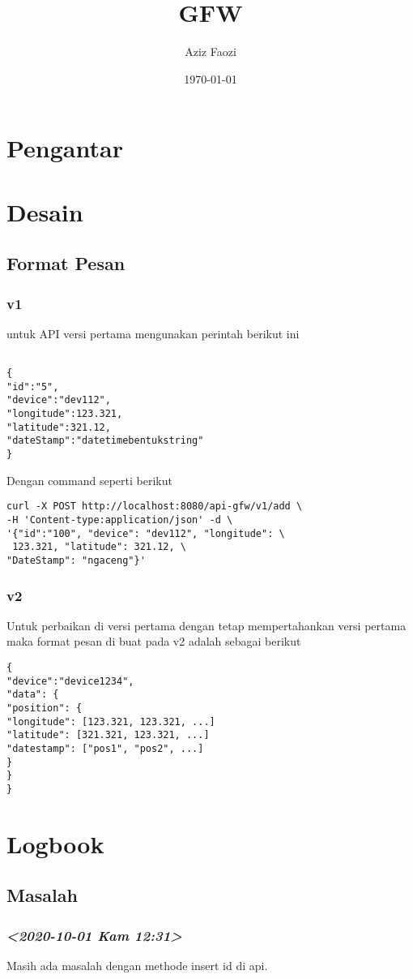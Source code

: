 \documentclass[11pt]{article}
\author{Aziz Faozi}
\date{\today}
\title{GFW}
\begin{document}
\maketitle
\tableofcontents



\section{Pengantar}
\label{sec:orgdb9e30b}
\section{Desain}
\label{sec:org3656973}
\subsection{Format Pesan}
\label{sec:org8dc29b2}
\subsubsection{v1}
\label{sec:org6b0d1f1}
untuk API versi pertama mengunakan perintah berikut ini
\begin{verbatim}

{
"id":"5",
"device":"dev112",
"longitude":123.321,
"latitude":321.12,
"dateStamp":"datetimebentukstring"
}

\end{verbatim}
Dengan command seperti berikut 
\begin{verbatim}
curl -X POST http://localhost:8080/api-gfw/v1/add \
-H 'Content-type:application/json' -d \
'{"id":"100", "device": "dev112", "longitude": \
 123.321, "latitude": 321.12, \
"DateStamp": "ngaceng"}'
\end{verbatim}

\subsubsection{v2}
\label{sec:orga349de1}
Untuk perbaikan di versi pertama dengan tetap mempertahankan 
versi pertama maka format pesan di buat pada v2 adalah sebagai berikut
\begin{verbatim}
{
"device":"device1234",
"data": {
"position": {
"longitude": [123.321, 123.321, ...]
"latitude": [321.321, 123.321, ...]
"datestamp": ["pos1", "pos2", ...]
}
}
}
\end{verbatim}
\section{Logbook}
\label{sec:orgfed0cc3}
\subsection{Masalah}
\label{sec:orge3f5cea}

\subsubsection{\textit{<2020-10-01 Kam 12:31>}}
\label{sec:org052c2e2}
Masih ada masalah dengan methode insert id di api. 
\end{document}
